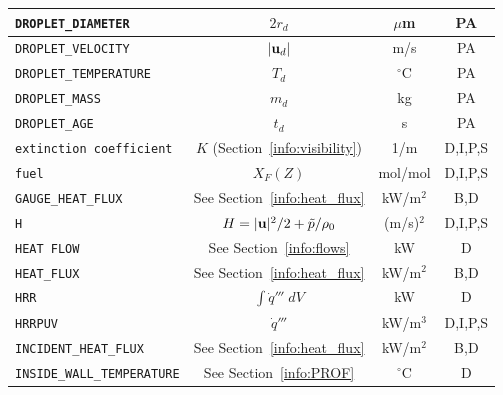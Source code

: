 \documentclass[11pt]{book}
\newcommand{\ct}{\tt\small}
\newcommand{\bu}{{\bf u}}
\newcommand{\tp}{\tilde{p}}
\newcommand{\dq}{\dot{q}}
\begin{document}
\begin{table}[h!]
\begin{center}
\begin{tabular}{|l|c|c|c|}
{\ct DROPLET\_DIAMETER}                         & $2 r_d$                                       & $\mu$m         & PA           \\ \hline
{\ct DROPLET\_VELOCITY}                         & $|\bu_d|$                                     & m/s            & PA           \\ \hline
{\ct DROPLET\_TEMPERATURE}                      & $T_d$                                         & $^\circ$C      & PA           \\ \hline
{\ct DROPLET\_MASS}                             & $m_d$                                         & kg             & PA           \\ \hline
{\ct DROPLET\_AGE}                              & $t_d$                                         & s              & PA           \\ \hline
{\ct extinction coefficient}                    & $K$ (Section~\ref{info:visibility})           & 1/m            & D,I,P,S      \\ \hline
{\ct fuel}                                      & $X_F(Z)$                                      & mol/mol        & D,I,P,S      \\ \hline
{\ct GAUGE\_HEAT\_FLUX}                         & See Section~\ref{info:heat_flux}              & kW/m$^2$       & B,D          \\ \hline
{\ct H}                                         & $H=|\bu|^2/2 + \tp/\rho_0$                    & (m/s)$^2$      & D,I,P,S      \\ \hline
{\ct HEAT FLOW}                                 & See Section~\ref{info:flows}                  & kW             & D            \\ \hline
{\ct HEAT\_FLUX}                                & See Section~\ref{info:heat_flux}              & kW/m$^2$       & B,D          \\ \hline
{\ct HRR}                                       & $\int \dq''' \; dV$                           & kW             & D            \\ \hline
{\ct HRRPUV}                                    & $\dq'''$                                      & kW/m$^3$       & D,I,P,S      \\ \hline
{\ct INCIDENT\_HEAT\_FLUX}                      & See Section~\ref{info:heat_flux}              & kW/m$^2$       & B,D          \\ \hline
{\ct INSIDE\_WALL\_TEMPERATURE}                 & See Section~\ref{info:PROF}                   & $^\circ$C      & D            \\ \hline

\end{tabular}
\end{center}
\end{table}
\end{document}
